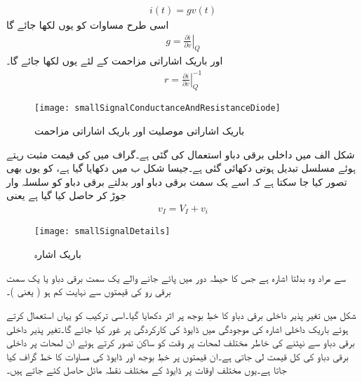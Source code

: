 \begin{align} \label{مساوات_موصلیت_نما_کے_استعمال_سے_رو_کا_حصول}
i(t)= g v(t)
\end{align}
اسی طرح مساوات   کو یوں لکھا جائے گا
\begin{align} \label{مساوات_موصلیت_نما_کی_تعریف}
g = \left .  \frac{\partial  i}{\partial v} \right |_Q
\end{align}
اور باریک اشاراتی مزاحمت  کے لئے یوں لکھا جائے گا۔
\begin{align}
r=\left . \frac{\partial i}{\partial v} \right|_Q ^{-1}
\end{align}

\begin{figure}
\centering
\texttt{[image: smallSignalConductanceAndResistanceDiode]}
\caption{ باریک اشاراتی موصلیت اور باریک اشاراتی مزاحمت}
\label{شکل_ڈایوڈ_کا_باریک_اشاراتی_مزاحمت}
\end{figure}
 \label{حصہ_باریک_اشاراتی_تجزیہ}
شکل  الف میں داخلی برقی دباو  استعمال کی گئی ہے۔گراف میں     کی قیمت مثبت رہتے ہوئے مسلسل تبدیل ہوتی دکھائی گئی ہے۔جیسا شکل  ب میں دکھایا گیا ہے،   کو یوں بھی تصور کیا جا سکتا ہے کہ اسے یک سمت برقی دباو   اور بدلتے برقی دباو   کو سلسلہ وار جوڑ کر حاصل کیا گیا ہے یعنی
\begin{align}
v_I = V_I+v_i
\end{align}
%
\begin{figure}
\centering
\texttt{[image: smallSignalDetails]}
\caption{باریک اشارہ}
\label{شکل_باریک_اشارہ}
\end{figure}

  سے مراد وہ بدلتا اشارہ ہے جس کا حیطہ دور میں پائے جانے والے یک سمت برقی دباو یا  یک سمت برقی رو کی قیمتوں سے نہایت کم ہو ( یعنی  )۔

شکل   میں تغیر پذیر داخلی برقی دباو کا خطِ بوجھ پر اثر دکھایا گیا۔اسی ترکیب کو یہاں استعمال کرتے ہوئے باریک داخلی اشارہ   کی موجودگی میں ڈایوڈ کی کارکردگی پر غور کیا جائے گا۔تغیر پذیر داخلی برقی دباو   سے نپٹنے کی خاطر مختلف لمحات پر وقت کو ساکن تصور کرتے ہوئے ان لمحات پر داخلی برقی دباو کی کل قیمت لی جاتی ہے۔ان قیمتوں پر خطِ بوجھ اور ڈایوڈ کی مساوات کا خط گراف کیا جاتا ہے۔یوں مختلف اوقات پر ڈایوڈ کے مختلف نقطہ مائل   حاصل کئے جاتے ہیں۔

